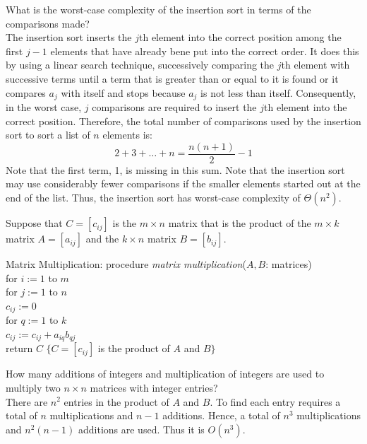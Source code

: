 \documentclass[12pt]{article}
\begin{document}
\begin{example} What is the worst-case complexity of the insertion sort in terms of the comparisons made? \\ The insertion sort inserts the $j$th element into the correct position among the first $j - 1$ elements that have already bene put into the correct order. It does this by using a linear search technique, successively comparing the $j$th element with successive terms until a term that is greater than or equal to it is found or it compares $a_j$ with itself and stops because $a_j$ is not less than itself. Consequently, in the worst case, $j$ comparisons are required to insert the $j$th element into the correct position. Therefore, the total number of comparisons used by the insertion sort to sort a list of $n$ elements is: $$ 2 + 3 + \dots + n = \frac{n(n + 1)}{2} - 1$$ Note that the first term, 1, is missing in this sum. Note that the insertion sort may use considerably fewer comparisons if the smaller elements started out at the end of the list. Thus, the insertion sort has worst-case complexity of $\Theta(n^2)$. \end{example} 
Suppose that $C = [c_{ij}]$ is the $m \times n$ matrix that is the product of the $m \times k$ matrix $A = [a_{ij}]$ and the $k \times n$ matrix $B = [b_{ij}]$. 
\begin{alg} Matrix Multiplication: 
procedure \textit{matrix multiplication}($A, B$: matrices) \\
for $i := 1$ to $m$ \\
\indent for $j := 1$ to $n$ \\
\indent \indent $c_{ij} := 0$ \\
\indent \indent for $q := 1$ to $k$ \\ 
\indent \indent \indent $c_{ij} := c_{ij} + a_{iq}b_{qj}$ \\
return $C$ $\{C = [c_{ij}]$ is the product of $A$ and $B\}$ \end{alg} 
\begin{example} How many additions of integers and multiplication of integers are used to multiply two $n \times n$ matrices with integer entries? \\ There are $n^2$ entries in the product of $A$ and $B$. To find each entry requires a total of $n$ multiplications and $n - 1$ additions. Hence, a total of $n^3$ multiplications and $n^2(n - 1)$ additions are used. Thus it is $O(n^3)$. \end{example} 
\end{document}

